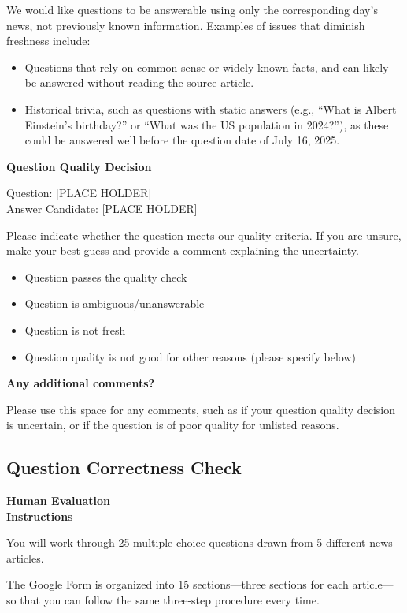 \documentclass[11pt]{article}
\begin{document}
We would like questions to be answerable using only the corresponding day's news, not previously known information. Examples of issues that diminish freshness include:
\begin{itemize}
    \item Questions that rely on common sense or widely known facts, and can likely be answered without reading the source article.
    \item Historical trivia, such as questions with static answers (e.g., ``What is Albert Einstein's birthday?'' or ``What was the US population in 2024?''), as these could be answered well before the question date of July 16, 2025.
\end{itemize}

\textbf{Question Quality Decision}

Question: [PLACE HOLDER]\\
Answer Candidate: [PLACE HOLDER]

Please indicate whether the question meets our quality criteria. If you are unsure, make your best guess and provide a comment explaining the uncertainty.
\begin{itemize}
    \item Question passes the quality check
    \item Question is ambiguous/unanswerable
    \item Question is not fresh
    \item Question quality is not good for other reasons (please specify below)
\end{itemize}

\textbf{Any additional comments?}

Please use this space for any comments, such as if your question quality decision is uncertain, or if the question is of poor quality for unlisted reasons.


\subsection{Question Correctness Check}

\textbf{Human Evaluation}\\
\textbf{Instructions}

You will work through 25 multiple-choice questions drawn from 5 different news articles.

The Google Form is organized into 15 sections—three sections for each article—so that you can follow the same three-step procedure every time.
\end{document}
